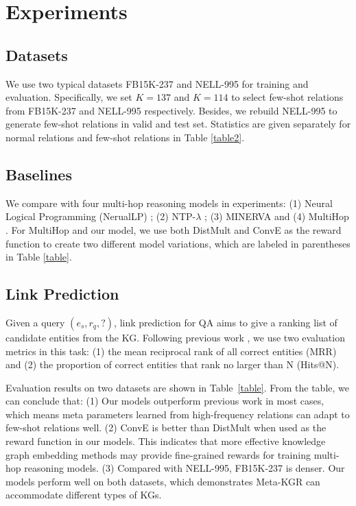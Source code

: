 \documentclass[11pt,a4paper]{article}
\begin{document}
\section{Experiments}

\subsection{Datasets}

We use two typical datasets FB15K-237 \cite{FB15K-237} and NELL-995 \cite{DeepPath} for training and evaluation. Specifically, we set $K = 137$ and $K = 114$ to select few-shot relations from FB15K-237 and NELL-995 respectively. Besides, we rebuild NELL-995 to generate few-shot relations in valid and test set. Statistics are given separately for normal relations and few-shot relations in Table \ref{table2}.

\subsection{Baselines}

We compare with four multi-hop reasoning models in experiments: (1) Neural Logical Programming (NerualLP) \cite{neuralLP}; (2) NTP-$\lambda$ \cite{NTP}; (3) MINERVA \cite{MINERVA} and (4) MultiHop \cite{MultiHop}. For MultiHop and our model, we use both DistMult \cite{DistMult} and ConvE \cite{ConvE} as the reward function to create two different model variations, which are labeled in parentheses in Table \ref{table}.

\subsection{Link Prediction}

Given a query $(e_s, r_q, ?)$, link prediction for QA aims to give a ranking list of candidate entities from the KG. Following previous work \cite{ConvE, MultiHop}, we use two evaluation metrics in this task: (1) the mean reciprocal rank of all correct entities (MRR) and (2) the proportion of correct entities that rank no larger than N (Hits@N). 

Evaluation results on two datasets are shown in Table~\ref{table}. From the table, we can conclude that: (1) Our models outperform previous work in most cases, which means meta parameters learned from high-frequency relations can adapt to few-shot relations well. (2) ConvE is better than DistMult when used as the reward function in our models. This indicates that more effective knowledge graph embedding methods may provide fine-grained rewards for training multi-hop reasoning models. (3) Compared with NELL-995, FB15K-237 is denser. Our models perform well on both datasets, which demonstrates Meta-KGR can accommodate different types of KGs.
\end{document}
